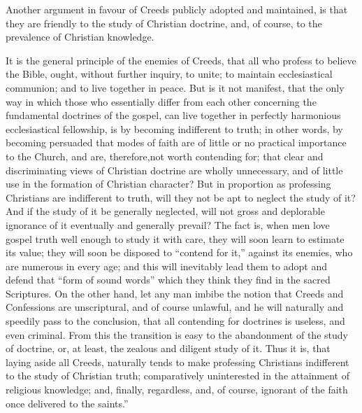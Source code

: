 \documentclass[
]{book}
\begin{document}
Another argument in favour of Creeds publicly adopted and maintained, is that they are friendly to the study of Christian doctrine, and, of course, to the prevalence of Christian knowledge.

It is the general principle of the enemies of Creeds, that all who profess to believe the Bible, ought, without further inquiry, to unite; to maintain ecclesiastical communion; and to live together in peace. But is it not manifest, that the only way in which those who essentially differ from each other concerning the fundamental doctrines of the gospel, can live together in perfectly harmonious ecclesiastical fellowship, is by becoming indifferent to truth; in other words, by becoming persuaded that modes of faith are of little or no practical importance to the Church, and are, therefore,not worth contending for; that clear and discriminating views of Christian doctrine are wholly unnecessary, and of little use in the formation of Christian character? But in proportion as professing Christians are indifferent to truth, will they not be apt to neglect the study of it? And if the study of it be generally neglected, will not gross and deplorable ignorance of it eventually and generally prevail? The fact is, when men love gospel truth well enough to study it with care, they will soon learn to estimate its value; they will soon be disposed to ``contend for it,'' against its enemies, who are numerous in every age; and this will inevitably lead them to adopt and defend that ``form of sound words'' which they think they find in the sacred Scriptures. On the other hand, let any man imbibe the notion that Creeds and Confessions are unscriptural, and of course unlawful, and he will naturally and speedily pass to the conclusion, that all contending for doctrines is useless, and even criminal. From this the transition is easy to the abandonment of the study of doctrine, or, at least, the zealous and diligent study of it. Thus it is, that laying aside all Creeds, naturally tends to make professing Christians indifferent to the study of Christian truth; comparatively uninterested in the attainment of religious knowledge; and, finally, regardless, and, of course, ignorant of the faith once delivered to the saints.''
\end{document}
